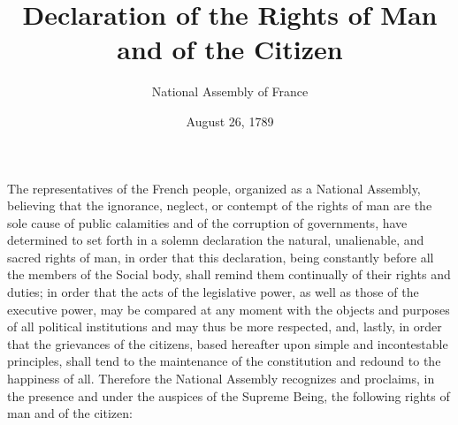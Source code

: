 \documentclass[letterpaper,12pt]{article}
\begin{document}
\title{Declaration of the Rights of Man and of the Citizen}
\author{National Assembly of France}
\date{August 26, 1789}
\maketitle
The representatives of the French people, organized as a National Assembly, believing that the ignorance, neglect, or contempt of the rights of man are the sole cause of public calamities and of the corruption of governments, have determined to set forth in a solemn declaration the natural, unalienable, and sacred rights of man, in order that this declaration, being constantly before all the members of the Social body, shall remind them continually of their rights and duties; in order that the acts of the legislative power, as well as those of the executive power, may be compared at any moment with the objects and purposes of all political institutions and may thus be more respected, and, lastly, in order that the grievances of the citizens, based hereafter upon simple and incontestable principles, shall tend to the maintenance of the constitution and redound to the happiness of all. Therefore the National Assembly recognizes and proclaims, in the presence and under the auspices of the Supreme Being, the following rights of man and of the citizen:
\end{document}

